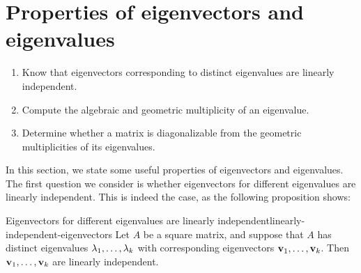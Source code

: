 \section{Properties of eigenvectors and eigenvalues}

\begin{outcome}
  \begin{enumerate}
  \item Know that eigenvectors corresponding to distinct eigenvalues
    are linearly independent.
  \item Compute the algebraic and geometric multiplicity of an
    eigenvalue.
  \item Determine whether a matrix is diagonalizable from the
    geometric multiplicities of its eigenvalues.
  \end{enumerate}
\end{outcome}

In this section, we state some useful properties of eigenvectors
and eigenvalues. The first question we consider is whether
eigenvectors for different eigenvalues are linearly independent. This
is indeed the case, as the following proposition shows:

\begin{proposition}{Eigenvectors for different eigenvalues are linearly independent}{linearly-independent-eigenvectors}
  Let $A$ be a square matrix, and suppose that $A$ has distinct
  eigenvalues $\lambda_1,\ldots,\lambda_k$ with
  corresponding eigenvectors $\mbox{\bf v}_1,\ldots,\mbox{\bf v}_k$.
  Then $\mbox{\bf v}_1,\ldots,\mbox{\bf v}_k$ are linearly independent.
\end{proposition}

